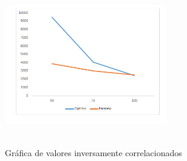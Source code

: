 \documentclass{article}
\begin{document}
\begin{figure}[!ht]
\centering
\includegraphics[width=7cm, height=7cm]{Inversamente.png}
\caption{Gráfica de valores inversamente correlacionados}
\end{figure}




\end{document}
